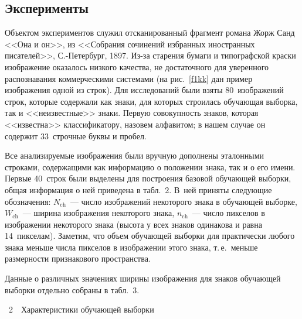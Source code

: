 \begin{multicols}{2}
\vspace*{-12pt}

\section{Эксперименты}

      Объектом экспериментов служил отсканированный фрагмент романа Жорж Санд <<Она и 
он>>, из <<Собрания сочинений избранных иностранных писателей>>, С.-Петербург, 1897. Из-за 
старения бумаги и типографской краски изображение оказалось низкого качества, не достаточного 
для уверенного распознавания коммерческими системами (на рис.~\ref{f1kk} дан пример 
изображения одной из строк). Для исследований были взяты 80~изображений строк, которые 
содержали как знаки, для которых строилась обучающая выборка, так и 
<<неизвестные>> знаки. 
Первую совокупность знаков, которая <<известна>> классификатору, назовем алфавитом; в 
нашем случае он содержит 33~строчные буквы и пробел. 

      Все анализируемые изображения были вручную дополнены эталонными строками, 
содержащими как информацию о положении знака, так и о его имени. Первые 40~строк были 
выделены для построения базовой обучающей выборки, общая информация о ней приведена в 
табл.~2. В~ней приняты следующие обозначения: $N_{\mathrm{ch}}$~--- число изображений 
некоторого знака в обучающей выборке, $W_{\mathrm{ch}}$~--- ширина изображения некоторого знака, 
$n_{\mathrm{ch}}$~--- число пикселов в изображении некоторого знака (высота у всех знаков одинакова и 
равна 14~пикселам). Заметим, что объем обучающей выборки для практически любого знака 
меньше числа пикселов в изображении этого знака, т.\,е.\ меньше размерности признакового 
пространства.
      
      Данные о различных значениях ширины изображения для знаков обучающей выборки 
отдельно собраны в табл.~3.

\begin{center} %
\noindent
{{\tablename~2}\ \ \small{Характеристики обучающей выборки}}
\end{center}


\end{multicols}

